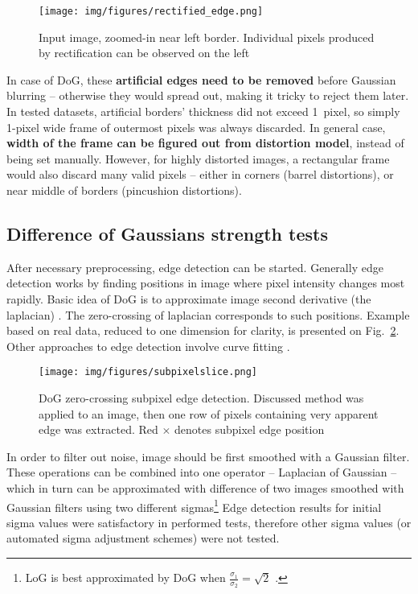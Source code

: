 \begin{figure}[ht]
	\centering\texttt{[image: img/figures/rectified\_edge.png]}
	\caption{ Input image, zoomed-in near left border. Individual pixels produced by rectification can be observed on the left }
	\label{fig:rectifcy_border}
\end{figure}

In case of DoG, these \textbf{artificial edges need to be removed} before Gaussian blurring -- otherwise they would spread out, making it tricky to reject them later. In tested datasets, artificial borders' thickness did not exceed 1~pixel, so simply 1-pixel wide frame of outermost pixels was always discarded. In general case, \textbf{width of the frame can be figured out from distortion model}, instead of being set manually. However, for highly distorted images, a rectangular frame would also discard many valid pixels -- either in corners (barrel distortions), or near middle of borders (pincushion distortions).

\subsection{Difference of Gaussians strength tests}

After necessary preprocessing, edge detection can be started. Generally edge detection works by finding positions in image where pixel intensity changes most rapidly. Basic idea of DoG is to approximate image second derivative (the laplacian) \cite{szeliski} \cite{jain1995machine}. The zero-crossing of laplacian corresponds to such positions. Example based on real data, reduced to one dimension for clarity, is presented on Fig.~\ref{fig:slice}. Other approaches to edge detection involve curve fitting \cite{fabijanska} \cite{devernay1995non} \cite{wei2010two}.

\begin{figure}[ht]
	\centering\texttt{[image: img/figures/subpixelslice.png]}
	\caption{ DoG zero-crossing subpixel edge detection. Discussed method was applied to an image, then one row of pixels containing very apparent edge was extracted. Red $\times$ denotes subpixel edge position }
	\label{fig:slice}
\end{figure}

In order to filter out noise, image should be first smoothed with a Gaussian filter. These operations can be combined into one operator -- Laplacian of Gaussian -- which in turn can be approximated with difference of two images smoothed with Gaussian filters using two different sigmas\footnote{LoG is best approximated by DoG when $\frac{\sigma_{1}}{\sigma_{2}} = \sqrt{2}$ \cite{sift}.} Edge detection results for initial sigma values were satisfactory in performed tests, therefore other sigma values (or automated sigma adjustment schemes) were not tested.

